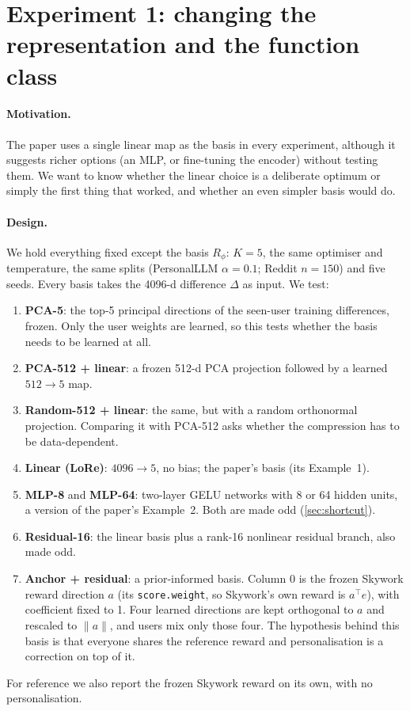 \documentclass[11pt,a4paper]{article}
\begin{document}
\section{Experiment 1: changing the representation and the function class}
\label{sec:arch}

\paragraph{Motivation.} The paper uses a single linear map as the basis in every experiment, although it
suggests richer options (an MLP, or fine-tuning the encoder) without testing them. We want to know
whether the linear choice is a deliberate optimum or simply the first thing that worked, and whether an
even simpler basis would do.

\paragraph{Design.} We hold everything fixed except the basis $R_\phi$: $K=5$, the same optimiser and
temperature, the same splits (PersonalLLM $\alpha=0.1$; Reddit $n=150$) and five seeds. Every basis
takes the 4096-d difference $\Delta$ as input. We test:
\begin{enumerate}[label=\arabic*.]
\item \textbf{PCA-5}: the top-5 principal directions of the seen-user training differences, frozen.
Only the user weights are learned, so this tests whether the basis needs to be learned at all.
\item \textbf{PCA-512 + linear}: a frozen 512-d PCA projection followed by a learned $512\to5$ map.
\item \textbf{Random-512 + linear}: the same, but with a random orthonormal projection. Comparing it
with PCA-512 asks whether the compression has to be data-dependent.
\item \textbf{Linear (LoRe)}: $4096\to5$, no bias; the paper's basis (its Example~1).
\item \textbf{MLP-8} and \textbf{MLP-64}: two-layer GELU networks with 8 or 64 hidden units, a version of
the paper's Example~2. Both are made odd (\cref{sec:shortcut}).
\item \textbf{Residual-16}: the linear basis plus a rank-16 nonlinear residual branch, also made odd.
\item \textbf{Anchor + residual}: a prior-informed basis. Column 0 is the frozen Skywork reward direction
$a$ (its \texttt{score.weight}, so Skywork's own reward is $a^\top e$), with coefficient fixed to 1. Four
learned directions are kept orthogonal to $a$ and rescaled to $\|a\|$, and users mix only those four.
The hypothesis behind this basis is that everyone shares the reference reward and personalisation is a
correction on top of it.
\end{enumerate}
For reference we also report the frozen Skywork reward on its own, with no personalisation.
\end{document}
